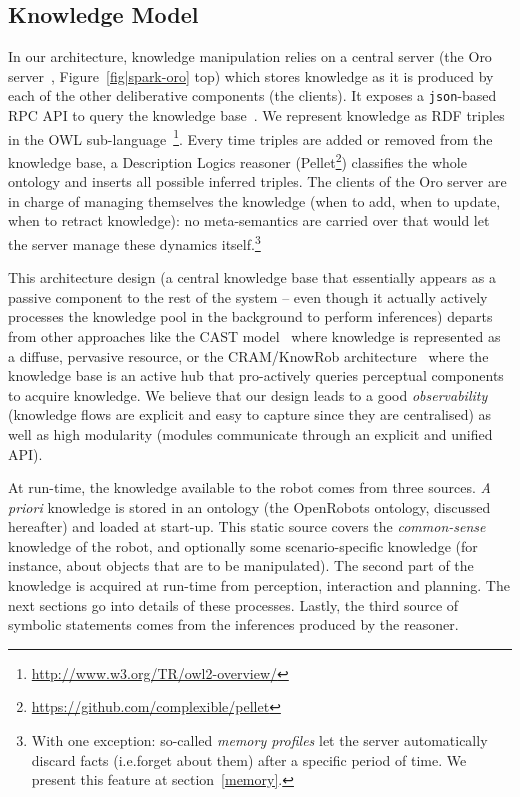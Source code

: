 \documentclass[preprint,3p,times]{elsarticle}
\newcommand{\ie}{{i.e.\xspace}}
\begin{document}
\subsection{Knowledge Model}

In our architecture, knowledge manipulation relies on a central server (the {\sc
Oro} server~\cite{Lemaignan2010}, Figure~\ref{fig|spark-oro} top) which stores
knowledge as it is produced by each of the other deliberative components (the
clients). It exposes a {\tt json}-based RPC API to query the knowledge
base~\cite{lemaignan2012kbapi}.  We represent knowledge as RDF triples in the
OWL sub-language~\footnote{\url{http://www.w3.org/TR/owl2-overview/}}. Every
time triples are added or removed from the knowledge base, a Description Logics
reasoner ({\sc Pellet}\footnote{\url{https://github.com/complexible/pellet}})
classifies the whole ontology and inserts all possible inferred triples.  The
clients of the {\sc Oro} server are in charge of managing themselves the
knowledge (when to add, when to update, when to retract knowledge): no
meta-semantics are carried over that would let the server manage these dynamics
itself.\footnote{With one exception: so-called \emph{memory profiles} let
the server automatically discard facts (\ie forget about them) after a specific
period of time. We present this feature at section~\ref{memory}.}

This architecture design (a central knowledge base that essentially appears as a
passive component to the rest of the system -- even though it actually actively
processes the knowledge pool in the background to perform inferences)
departs from other approaches like the CAST model~\cite{Hawes2007} where
knowledge is represented as a diffuse, pervasive resource, or the CRAM/KnowRob
architecture~\cite{Beetz2010} where the knowledge base is an active hub that
pro-actively queries perceptual components to acquire knowledge. We believe that
our design leads to a good \emph{observability} (knowledge flows are explicit
and easy to capture since they are centralised) as well as high modularity
(modules communicate through an explicit and unified API).

At run-time, the knowledge available to the robot comes from three sources. {\it
A priori} knowledge is stored in an ontology (the {\sc OpenRobots} ontology,
discussed hereafter) and loaded at start-up. This static source covers the
\emph{common-sense} knowledge of the robot, and optionally some
scenario-specific knowledge (for instance, about objects that are to be
manipulated). The second part of the knowledge is acquired at run-time from
perception, interaction and planning. The next sections go into details of these
processes. Lastly, the third source of symbolic statements comes from the
inferences produced by the reasoner.
\end{document}
